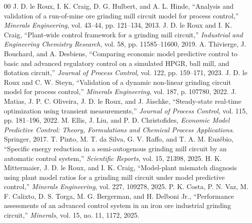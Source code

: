 \documentclass[conference]{IEEEtran}
\begin{document}
\begin{thebibliography}{00}
 J. D. le Roux, I. K. Craig, D. G. Hulbert, and A. L.
Hinde, ``Analysis and validation of a run-of-mine ore grinding mill
circuit model for process control,'' \emph{Minerals Engineering}, vol.
43--44, pp. 121--134, 2013.
 J. D. le Roux and I. K. Craig, ``Plant-wide control
framework for a grinding mill circuit,'' \emph{Industrial and Engineering
Chemistry Research}, vol. 58, pp. 11585--11600, 2019.
 A. Thivierge, J. Bouchard, and A. Desbiens,
``Comparing economic model predictive control to basic and advanced
regulatory control on a simulated HPGR, ball mill, and flotation
circuit,'' \emph{Journal of Process Control}, vol. 122, pp. 159--171,
2023.
 J. D. le Roux and C. W. Steyn, ``Validation of a
dynamic non-linear grinding circuit model for process control,''
\emph{Minerals Engineering}, vol. 187, p. 107780, 2022.
 J. Matias, J. P. C. Oliveira, J. D. le Roux, and J.
J\"{a}schke, ``Steady-state real-time optimization using transient
measurements,'' \emph{Journal of Process Control}, vol. 115, pp. 181--196,
2022.
 M. Ellis, J. Liu, and P. D. Christofides,
\emph{Economic Model Predictive Control: Theory, Formulations and Chemical
Process Applications}. Springer, 2017.
 T. Pinto, M. T. da Silva, G. V. Raffo, and T. A. M.
Euz\'ebio, ``Specific energy reduction in a semi-autogenous grinding mill
circuit by an automatic control system,'' \emph{Scientific Reports},
vol. 15, 21398, 2025.
 H. K. Mittermaier, J. D. le Roux, and I. K.
Craig, ``Model-plant mismatch diagnosis using plant model ratios for a
grinding mill circuit under model predictive control,'' \emph{Minerals
Engineering}, vol. 227, 109278, 2025.
 P. K. Costa, P. N. Vaz, M. F. Calixto, D. S. Torga,
M. G. Bergerman, and H. Delboni Jr., ``Performance assessments of an
advanced control system in an iron ore industrial grinding circuit,''
\emph{Minerals}, vol. 15, no. 11, 1172, 2025.
\end{thebibliography}
\end{document}
